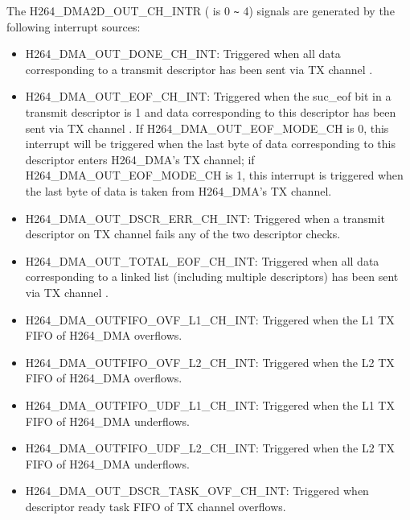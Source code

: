 \documentclass[main\_\_EN.tex]{subfiles}
\begin{document}
The \label{int:H264DMAOUTCHNINT}H264\_DMA2D\_OUT\_CH{}\_INTR ( is 0 \verb+~+ 4) signals are generated by the following interrupt sources:

\begin{itemize}
\item \label{int:H264DMAOUTDONECHNINT}H264\_DMA\_OUT\_DONE\_CH{}\_INT: Triggered when all data corresponding to a transmit descriptor has been sent via TX channel .
\item \label{int:H264DMAOUTEOFCHNINT}H264\_DMA\_OUT\_EOF\_CH{}\_INT: Triggered when the suc\_eof bit in a transmit descriptor is 1 and data corresponding to this descriptor has been sent via TX channel . If H264\_DMA\_OUT\_EOF\_MODE\_CH{} is 0, this interrupt will be triggered when the last byte of data corresponding to this descriptor enters H264\_DMA's TX channel; if H264\_DMA\_OUT\_EOF\_MODE\_CH{} is 1, this interrupt is triggered when the last byte of data is taken from H264\_DMA's TX channel.
\item \label{int:H264DMAOUTDSCRERRCHNINT}H264\_DMA\_OUT\_DSCR\_ERR\_CH{}\_INT: Triggered when a transmit descriptor on TX channel  fails any of the two descriptor checks.
\item \label{int:H264DMAOUTTOTALEOFCHNINT}H264\_DMA\_OUT\_TOTAL\_EOF\_CH{}\_INT: Triggered when all data corresponding to a linked list (including multiple descriptors) has been sent via TX channel .
\item \label{int:H264DMAOUTFIFOOVFL1CHNINT}H264\_DMA\_OUTFIFO\_OVF\_L1\_CH{}\_INT: Triggered when the L1 TX FIFO of H264\_DMA overflows.
\item \label{int:H264DMAOUTFIFOOVFL2CHNINT}H264\_DMA\_OUTFIFO\_OVF\_L2\_CH{}\_INT: Triggered when the L2 TX FIFO of H264\_DMA overflows.
\item \label{int:H264DMAOUTFIFOUDFL1CHNINT}H264\_DMA\_OUTFIFO\_UDF\_L1\_CH{}\_INT: Triggered when the L1 TX FIFO of H264\_DMA underflows.
\item \label{int:H264DMAOUTFIFOUDFL2CHNINT}H264\_DMA\_OUTFIFO\_UDF\_L2\_CH{}\_INT: Triggered when the L2 TX FIFO of H264\_DMA underflows.
\item \label{int:H264DMAOUTDSCRTASKOVFCHNINT}H264\_DMA\_OUT\_DSCR\_TASK\_OVF\_CH{}\_INT: Triggered when descriptor ready task FIFO of TX channel  overflows.
\end{itemize}
\end{document}
